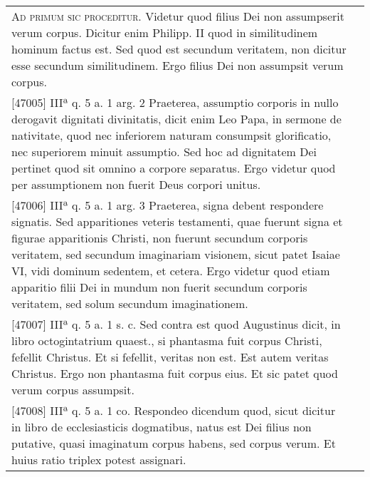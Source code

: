 \documentclass[10pt]{jsarticle} %
\begin{document}
\begin{longtable}{p{21em}p{21em}}

{\Huge A}{\scshape d primum sic proceditur}. Videtur quod filius Dei non assumpserit verum
corpus. Dicitur enim Philipp. II quod in similitudinem hominum factus
est. Sed quod est secundum veritatem, non dicitur esse secundum
similitudinem. Ergo filius Dei non assumpsit verum corpus.


&


\\


[47005] IIIª q. 5 a. 1 arg. 2
Praeterea, assumptio corporis in nullo derogavit dignitati divinitatis,
dicit enim Leo Papa, in sermone de nativitate, quod nec inferiorem
naturam consumpsit glorificatio, nec superiorem minuit assumptio. Sed
hoc ad dignitatem Dei pertinet quod sit omnino a corpore separatus. Ergo
videtur quod per assumptionem non fuerit Deus corpori unitus.


&


\\


[47006] IIIª q. 5 a. 1 arg. 3
Praeterea, signa debent respondere signatis. Sed apparitiones veteris
testamenti, quae fuerunt signa et figurae apparitionis Christi, non
fuerunt secundum corporis veritatem, sed secundum imaginariam visionem,
sicut patet Isaiae VI, vidi dominum sedentem, et cetera. Ergo videtur
quod etiam apparitio filii Dei in mundum non fuerit secundum corporis
veritatem, sed solum secundum imaginationem.


&


\\


[47007] IIIª q. 5 a. 1 s. c.
Sed contra est quod Augustinus dicit, in libro octogintatrium quaest.,
si phantasma fuit corpus Christi, fefellit Christus. Et si fefellit,
veritas non est. Est autem veritas Christus. Ergo non phantasma fuit
corpus eius. Et sic patet quod verum corpus assumpsit.


&


\\


[47008] IIIª q. 5 a. 1 co.
Respondeo dicendum quod, sicut dicitur in libro de ecclesiasticis
dogmatibus, natus est Dei filius non putative, quasi imaginatum corpus
habens, sed corpus verum. Et huius ratio triplex potest
assignari. 

&



\\


\end{longtable}
\end{document}
